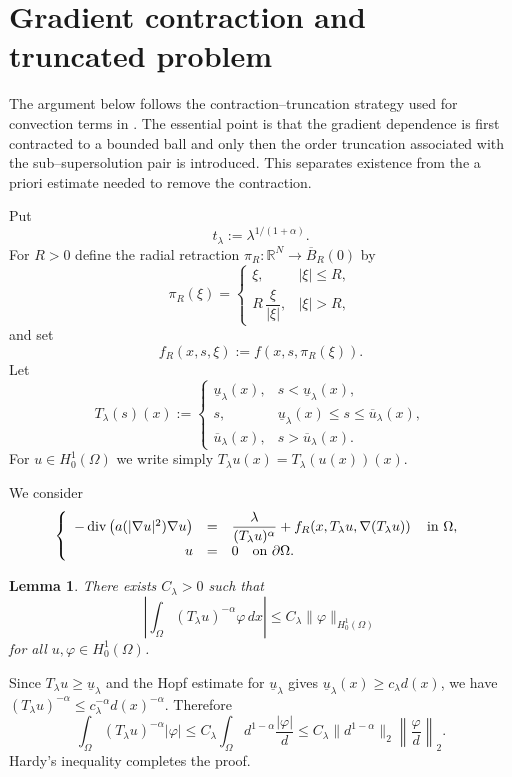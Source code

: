 \documentclass[11pt,leqno]{amsart}
\makeatletter
\newtheorem{lemma}[theorem]{Lemma}
\renewenvironment{proof}[1][\proofname]{%
  \par
  \pushQED{\qed}%
  \normalfont
  \topsep6\p@\@plus6\p@\relax
  \trivlist
  \item[\hskip\labelsep\itshape #1\@addpunct{.}]%
  \hspace{0.5em}\ignorespaces
}{%
  \popQED
  \endtrivlist\@endpefalse
}
\makeatother
\begin{document}
\section{Gradient contraction and truncated problem}\label{S4}

The argument below follows the contraction--truncation strategy used for
convection terms in \cite{AFM2024}.  The essential point is that the
gradient dependence is first contracted to a bounded ball and only then
the order truncation associated with the sub--supersolution pair is
introduced.  This separates existence from the a priori estimate needed
to remove the contraction.

Put
\[
t_\lambda:=\lambda^{1/(1+\alpha)}.
\]
For $R>0$ define the radial retraction $\pi_R:\mathbb R^N\to
\overline B_R(0)$ by
\[
\pi_R(\xi)=
\begin{cases}
\xi,&|\xi|\le R,\\[1mm]
R\,\dfrac{\xi}{|\xi|},&|\xi|>R,
\end{cases}
\]
and set
\[
f_R(x,s,\xi):=f(x,s,\pi_R(\xi)).
\]
Let
\[
T_\lambda(s)(x):=
\begin{cases}
\underline u_\lambda(x),&s<\underline u_\lambda(x),\\
s,&\underline u_\lambda(x)\le s\le\overline u_\lambda(x),\\
\overline u_\lambda(x),&s>\overline u_\lambda(x).
\end{cases}
\]
For $u\in H_0^1(\Omega)$ we write simply $T_\lambda u(x)=T_\lambda(u(x))(x)$.

We consider
\begin{equation}\label{PRT}
\left\{
\begin{array}{rcl}
-\operatorname{div}\left(a(|\nabla u|^2)\nabla u\right)
&=&\displaystyle
\frac{\lambda}{(T_\lambda u)^\alpha}
+f_R\!\left(x,T_\lambda u,\nabla(T_\lambda u)\right)
\quad\hbox{in }\Omega,\\
u&=&0\quad\hbox{on }\partial\Omega .
\end{array}
\right.
\end{equation}

\begin{lemma}\label{singularfunctional}
There exists $C_\lambda>0$ such that
\[
\left|\int_\Omega (T_\lambda u)^{-\alpha}\varphi\,dx\right|
\le C_\lambda\|\varphi\|_{H_0^1(\Omega)}
\]
for all $u,\varphi\in H_0^1(\Omega)$.
\end{lemma}

\begin{proof}
Since $T_\lambda u\ge\underline u_\lambda$ and the Hopf estimate for
$\underline u_\lambda$ gives
$\underline u_\lambda(x)\ge c_\lambda d(x)$, we have
$(T_\lambda u)^{-\alpha}\le c_\lambda^{-\alpha}d(x)^{-\alpha}$.
Therefore
\[
\int_\Omega (T_\lambda u)^{-\alpha}|\varphi|
\le C_\lambda\int_\Omega d^{1-\alpha}\frac{|\varphi|}{d}
\le C_\lambda\|d^{1-\alpha}\|_2
\left\|\frac{\varphi}{d}\right\|_2.
\]
Hardy's inequality completes the proof.
\end{proof}
\end{document}
